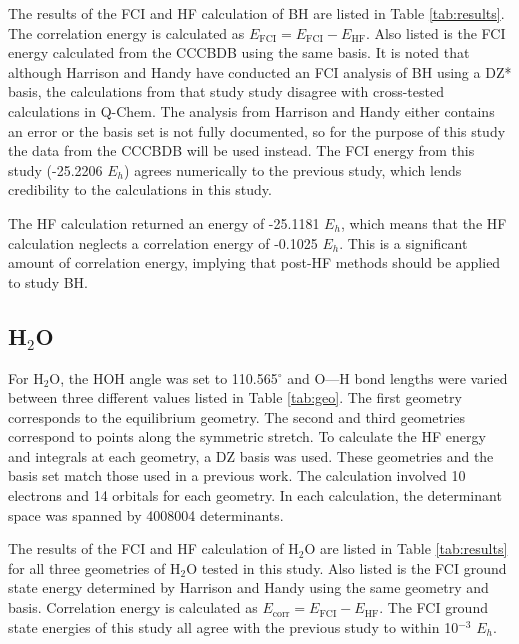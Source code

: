 \documentclass[final,3p,times,twocolumn]{elsarticle}
\begin{document}
The results of the FCI and HF calculation of BH are listed in Table \ref{tab:results}. The correlation energy is calculated as $E_{\text{FCI}} = E_{\text{FCI}} - E_{\text{HF}}$. Also listed is the FCI energy calculated from the CCCBDB using the same basis.\cite{cccbdb} It is noted that although Harrison and Handy have conducted an FCI analysis of BH using a DZ* basis,\cite{handy-1983} the calculations from that study study disagree with cross-tested calculations in Q-Chem. The analysis from Harrison and Handy either contains an error or the basis set is not fully documented, so for the purpose of this study the data from the CCCBDB will be used instead. The FCI energy from this study (-25.2206 $E_h$) agrees numerically to the previous study, which lends credibility to the calculations in this study. %


The HF calculation returned an energy of -25.1181 $E_h$, which means that the HF calculation neglects a correlation energy of -0.1025 $E_h$. This is a significant amount of correlation energy, implying that post-HF methods should be applied to study BH.


\subsection{H$_2$O} \label{sec:h2oresults}

For H$_2$O, the HOH angle was set to 110.565$^\circ$ and O---H bond lengths were varied between three different values listed in Table \ref{tab:geo}. The first geometry corresponds to the equilibrium geometry. The second and third geometries correspond to points along the symmetric stretch. To calculate the HF energy and integrals at each geometry, a DZ basis was used.\cite{dunning} These geometries and the basis set match those used in a previous work.\cite{handy-1983} The calculation involved 10 electrons and 14 orbitals for each geometry. In each calculation, the determinant space was spanned by 4008004 determinants.

The results of the FCI and HF calculation of H$_2$O are listed in Table \ref{tab:results} for all three geometries of H$_2$O tested in this study. Also listed is the FCI ground state energy determined by Harrison and Handy using the same geometry and basis.\cite{handy-1983} Correlation energy is calculated as $E_{\text{corr}} = E_{\text{FCI}} - E_{\text{HF}}$. The FCI ground state energies of this study all agree with the previous study to within 10$^{-3}$ $E_h$. %
\end{document}

